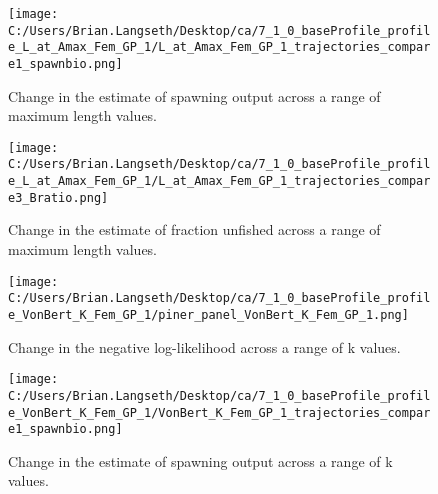 \documentclass[11pt,
  english,
  letterpaper,
]{article}
\begin{document}
\tagmcend\tagstructend


\begin{figure}
\centering
\texttt{[image: C:/Users/Brian.Langseth/Desktop/ca/7\_1\_0\_baseProfile\_profile\_L\_at\_Amax\_Fem\_GP\_1/L\_at\_Amax\_Fem\_GP\_1\_trajectories\_compare1\_spawnbio.png]}
\caption{Change in the estimate of spawning output across a range of maximum length values.\label{fig:linf-ssb}}
\end{figure}

\tagmcend\tagstructend


\begin{figure}
\centering
\texttt{[image: C:/Users/Brian.Langseth/Desktop/ca/7\_1\_0\_baseProfile\_profile\_L\_at\_Amax\_Fem\_GP\_1/L\_at\_Amax\_Fem\_GP\_1\_trajectories\_compare3\_Bratio.png]}
\caption{Change in the estimate of fraction unfished across a range of maximum length values.\label{fig:linf-depl}}
\end{figure}

\tagmcend\tagstructend


\begin{figure}
\centering
\texttt{[image: C:/Users/Brian.Langseth/Desktop/ca/7\_1\_0\_baseProfile\_profile\_VonBert\_K\_Fem\_GP\_1/piner\_panel\_VonBert\_K\_Fem\_GP\_1.png]}
\caption{Change in the negative log-likelihood across a range of k values.\label{fig:k-profile}}
\end{figure}

\tagmcend\tagstructend


\begin{figure}
\centering
\texttt{[image: C:/Users/Brian.Langseth/Desktop/ca/7\_1\_0\_baseProfile\_profile\_VonBert\_K\_Fem\_GP\_1/VonBert\_K\_Fem\_GP\_1\_trajectories\_compare1\_spawnbio.png]}
\caption{Change in the estimate of spawning output across a range of k values.\label{fig:k-ssb}}
\end{figure}
\end{document}
